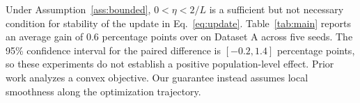 Under Assumption~\ref{ass:bounded}, $0 < \eta < 2/L$ is a sufficient but not necessary condition for stability of the update in Eq.~\eqref{eq:update}. Table~\ref{tab:main} reports an average gain of 0.6 percentage points over \citet{lee2024baseline} on Dataset A across five seeds. The 95\% confidence interval for the paired difference is $[-0.2, 1.4]$ percentage points, so these experiments do not establish a positive population-level effect. Prior work analyzes a convex objective. Our guarantee instead assumes local smoothness along the optimization trajectory.
